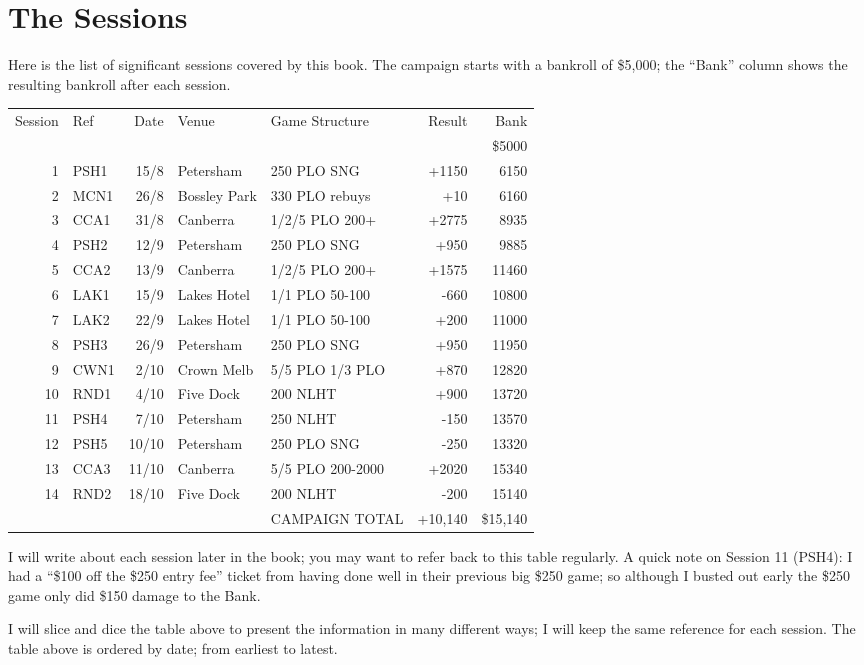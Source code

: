 \chapter{The Sessions}

Here is the list of significant sessions covered by this book. The
campaign starts with a bankroll of \$5,000; the ``Bank'' column shows
the resulting bankroll after each session.

\begin{tabular}{rlrllrr}
 Session & Ref & Date & Venue & Game Structure & Result & Bank \\
     &           &      &           &             &       & \$5000 \\
  1  &   PSH1    & 15/8 & Petersham & 250 PLO SNG & +1150 & 6150 \\
  2  &   MCN1    & 26/8 & Bossley Park & 330 PLO rebuys & +10 & 6160 \\
  3  &   CCA1    & 31/8 & Canberra  & 1/2/5 PLO 200+ & +2775 & 8935 \\
  4  &   PSH2    & 12/9 & Petersham & 250 PLO SNG & +950 & 9885 \\
  5  &   CCA2    & 13/9 & Canberra  & 1/2/5 PLO 200+ & +1575 & 11460 \\
  6  &   LAK1    & 15/9 & Lakes Hotel & 1/1 PLO 50-100 & -660 & 10800 \\
  7  &   LAK2    & 22/9 & Lakes Hotel & 1/1 PLO 50-100 & +200 & 11000 \\
  8  &   PSH3    & 26/9 & Petersham & 250 PLO SNG & +950 & 11950 \\
  9  &   CWN1    & 2/10 & Crown Melb & 5/5 PLO 1/3 PLO & +870 & 12820 \\
 10  &   RND1    & 4/10 & Five Dock & 200 NLHT & +900 & 13720 \\
 11  &   PSH4    & 7/10 & Petersham & 250 NLHT & -150 & 13570 \\
 12  &   PSH5    & 10/10 & Petersham & 250 PLO SNG & -250 & 13320 \\
 13  &   CCA3    & 11/10 & Canberra  & 5/5 PLO 200-2000 & +2020 & 15340 \\
 14  &   RND2    & 18/10 & Five Dock & 200 NLHT & -200 & 15140 \\
     &           &       &           & CAMPAIGN TOTAL & +10,140 & \$15,140 \\
\end{tabular}

I will write about each session later in the book; you may want to
refer back to this table regularly. A quick note on Session 11 (PSH4): I had
a ``\$100 off the \$250 entry fee'' ticket from having done well in
their previous big \$250 game; so although I busted out early the \$250
game only did \$150 damage to the Bank.

I will slice and dice the table above to present the information in
many different ways; I will keep the same reference for each
session. The table above is ordered by date; from earliest to latest.
